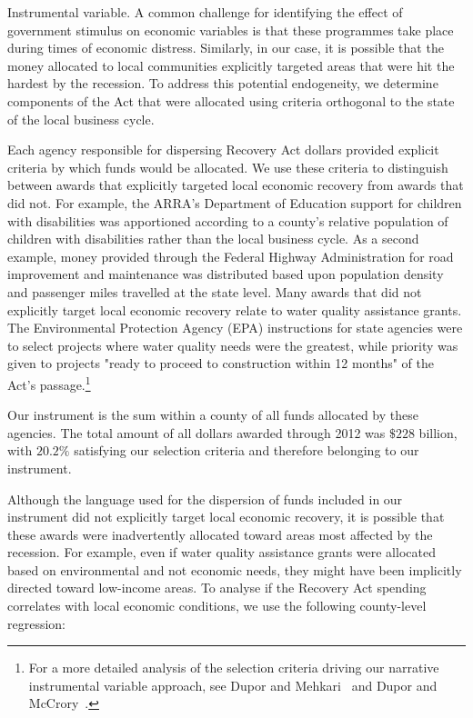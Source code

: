 \documentclass[\latexroot/\projectname]{subfiles}
\begin{document}


Instrumental variable. A common challenge for identifying the effect of government stimulus on economic variables is that these programmes take place during times of economic distress. Similarly, in our case, it is possible that the money allocated to local communities explicitly targeted areas that were hit the hardest by the recession. To address this potential endogeneity, we determine components of the Act that were allocated using criteria orthogonal to the state of the local business cycle.

Each agency responsible for dispersing Recovery Act dollars provided explicit criteria by which funds would be allocated. We use these criteria to distinguish between awards that explicitly targeted local economic recovery from awards that did not. For example, the ARRA's Department of Education support for children with disabilities was apportioned according to a county's relative population of children with disabilities rather than the local business cycle. As a second example, money provided through the Federal Highway Administration for road improvement and maintenance was distributed based upon population density and passenger miles travelled at the state level. Many awards that did not explicitly target local economic recovery relate to water quality assistance grants. The Environmental Protection Agency (EPA) instructions for state agencies were to select projects where water quality needs were the greatest, while priority was given to projects "ready to proceed to construction within 12 months" of the Act's passage.\footnote{For a more detailed analysis of the selection criteria driving our narrative instrumental variable approach, see Dupor and Mehkari~\cite{Dupor2014-hh} and Dupor and McCrory~\cite{Dupor2018-zh}.}

Our instrument is the sum within a county of all funds allocated by these agencies. The total amount of all dollars awarded through 2012 was $\$ 228$ billion, with $20.2 \%$ satisfying our selection criteria and therefore belonging to our instrument.

Although the language used for the dispersion of funds included in our instrument did not explicitly target local economic recovery, it is possible that these awards were inadvertently allocated toward areas most affected by the recession. For example, even if water quality assistance grants were allocated based on environmental and not economic needs, they might have been implicitly directed toward low-income areas. To analyse if the Recovery Act spending correlates with local economic conditions, we use the following county-level regression:
\end{document}
